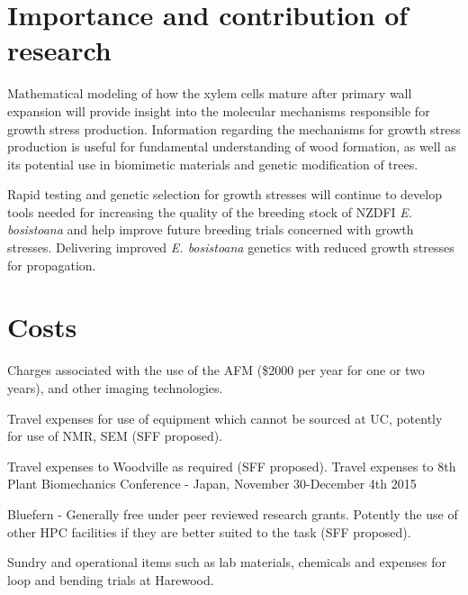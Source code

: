 \documentclass{article}
\begin{document}
\section{Importance and contribution of research}
Mathematical modeling of how the xylem cells mature after primary
wall expansion will provide insight into the molecular mechanisms
responsible for growth stress production. Information regarding the mechanisms
for growth stress production is useful for fundamental understanding of
wood formation, as well as its potential use in biomimetic materials and
genetic modification of trees.

Rapid testing and genetic selection for growth stresses will continue to develop
tools needed for increasing the quality of the breeding stock of NZDFI
\textit{E. bosistoana} and help improve future breeding trials concerned with
growth stresses. Delivering improved \textit{E. bosistoana} genetics with
reduced growth stresses for propagation.


\section{Costs}
Charges associated with the use of the AFM (\$2000 per year for one or two
years), and other imaging technologies.

Travel expenses for use of equipment which cannot be sourced at UC, potently for
use of NMR, SEM (SFF proposed).

Travel expenses to Woodville as required (SFF proposed).
Travel expenses to 8th Plant Biomechanics Conference - Japan, November
30-December 4th 2015

Bluefern - Generally free under peer reviewed research grants. Potently the use
of other HPC facilities if they are better suited to the task (SFF proposed).

Sundry and operational items such as lab materials, chemicals and expenses for
loop and bending trials at Harewood.
\end{document}
